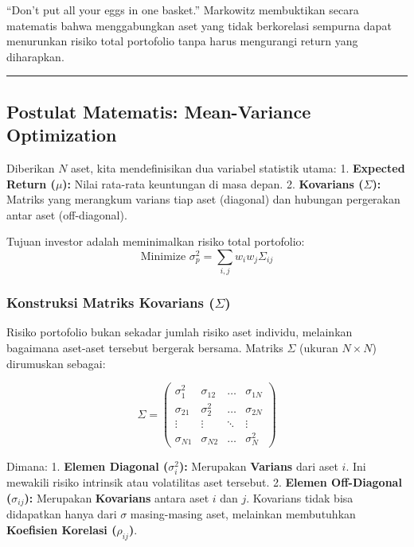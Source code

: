 ``Don't put all your eggs in one basket.'' Markowitz membuktikan secara matematis bahwa menggabungkan aset yang tidak berkorelasi sempurna dapat menurunkan risiko total portofolio tanpa harus mengurangi return yang diharapkan.

\begin{center}\rule{0.5\linewidth}{0.5pt}\end{center}

\hypertarget{postulat-matematis-mean-variance-optimization}{%
\subsection{Postulat Matematis: Mean-Variance Optimization}\label{postulat-matematis-mean-variance-optimization}}

Diberikan \(N\) aset, kita mendefinisikan dua variabel statistik utama: 1. \textbf{Expected Return (\(\mu\)):} Nilai rata-rata keuntungan di masa depan. 2. \textbf{Kovarians (\(\Sigma\)):} Matriks yang merangkum varians tiap aset (diagonal) dan hubungan pergerakan antar aset (off-diagonal).

Tujuan investor adalah meminimalkan risiko total portofolio: \[ \text{Minimize } \sigma_p^2 = \sum_{i,j} w_i w_j \Sigma_{ij} \]

\hypertarget{konstruksi-matriks-kovarians-sigma}{%
\subsubsection{\texorpdfstring{Konstruksi Matriks Kovarians (\(\Sigma\))}{Konstruksi Matriks Kovarians (\textbackslash Sigma)}}\label{konstruksi-matriks-kovarians-sigma}}

Risiko portofolio bukan sekadar jumlah risiko aset individu, melainkan bagaimana aset-aset tersebut bergerak bersama. Matriks \(\Sigma\) (ukuran \(N \times N\)) dirumuskan sebagai:

\[ \Sigma = \begin{pmatrix} 
\sigma_1^2 & \sigma_{12} & \dots & \sigma_{1N} \\
\sigma_{21} & \sigma_2^2 & \dots & \sigma_{2N} \\
\vdots & \vdots & \ddots & \vdots \\
\sigma_{N1} & \sigma_{N2} & \dots & \sigma_N^2
\end{pmatrix} \]

Dimana: 1. \textbf{Elemen Diagonal (\(\sigma_i^2\)):} Merupakan \textbf{Varians} dari aset \(i\). Ini mewakili risiko intrinsik atau volatilitas aset tersebut. 2. \textbf{Elemen Off-Diagonal (\(\sigma_{ij}\)):} Merupakan \textbf{Kovarians} antara aset \(i\) dan \(j\). Kovarians tidak bisa didapatkan hanya dari \(\sigma\) masing-masing aset, melainkan membutuhkan \textbf{Koefisien Korelasi (\(\rho_{ij}\))}.

